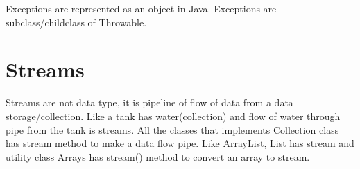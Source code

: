 \documentclass[10 pt]{article}
\begin{document}
Exceptions are represented as an object in Java. Exceptions are subclass/childclass of Throwable.

\section{Streams}
Streams are not data type, it is pipeline of flow of data from a data storage/collection. Like a tank has water(collection) and flow of water through pipe from the tank is streams. All the classes that implements Collection class has stream method to make a data flow pipe. Like ArrayList, List has stream and utility class Arrays has stream() method to convert an array to stream.
\end{document}
